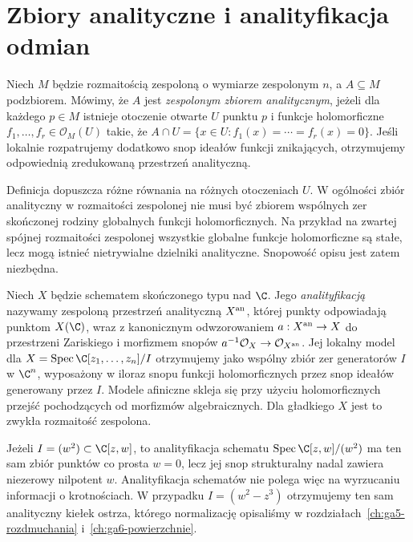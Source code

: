 \section{Zbiory analityczne i analityfikacja odmian}
\label{sec:ga9-analityczne}

\begin{definicja}
Niech $M$ będzie rozmaitością zespoloną o wymiarze zespolonym $n$,
a $A\subseteq M$ podzbiorem. Mówimy, że $A$ jest
\emph{zespolonym zbiorem analitycznym}, jeżeli dla każdego $p\in M$
istnieje otoczenie otwarte $U$ punktu $p$ i funkcje holomorficzne
$f_1,\ldots,f_r\in\mathcal O_M(U)$ takie, że
$A\cap U=\{x\in U:f_1(x)=\cdots=f_r(x)=0\}$.
Jeśli lokalnie rozpatrujemy dodatkowo snop ideałów funkcji znikających,
otrzymujemy odpowiednią zredukowaną przestrzeń analityczną.
\end{definicja}

\begin{uwaga}
Definicja dopuszcza różne równania na różnych otoczeniach $U$.
W ogólności zbiór analityczny w rozmaitości zespolonej nie musi być
zbiorem wspólnych zer skończonej rodziny globalnych funkcji
holomorficznych. Na przykład na zwartej spójnej rozmaitości zespolonej
wszystkie globalne funkcje holomorficzne są stałe, lecz mogą istnieć
nietrywialne dzielniki analityczne. Snopowość opisu jest zatem
niezbędna.
\end{uwaga}

\begin{definicja}[Analityfikacja]
Niech $X$ będzie schematem skończonego typu nad $\C$. Jego
\emph{analityfikacją} nazywamy zespoloną przestrzeń analityczną
$X^{\rm an}$, której punkty odpowiadają punktom $X(\C)$,
wraz z kanonicznym odwzorowaniem $a:X^{\rm an}\to X$
do przestrzeni Zariskiego i morfizmem snopów
$a^{-1}\mathcal O_X\to\mathcal O_{X^{\rm an}}$.
Jej lokalny model dla
$X=\operatorname{Spec}\C[z_1,\ldots,z_n]/I$ otrzymujemy jako wspólny
zbiór zer generatorów $I$ w $\C^n$, wyposażony w iloraz snopu
funkcji holomorficznych przez snop ideałów generowany przez $I$.
Modele afiniczne skleja się przy użyciu holomorficznych przejść
pochodzących od morfizmów algebraicznych. Dla gładkiego $X$ jest to
zwykła rozmaitość zespolona.
\end{definicja}

\begin{uwaga}
Jeżeli $I=(w^2)\subset\C[z,w]$, to analityfikacja schematu
$\operatorname{Spec}\C[z,w]/(w^2)$ ma ten sam zbiór punktów co prosta
$w=0$, lecz jej snop strukturalny nadal zawiera niezerowy nilpotent
$w$. Analityfikacja schematów nie polega więc na wyrzucaniu informacji
o krotnościach. W przypadku $I=(w^2-z^3)$ otrzymujemy ten sam
analityczny kiełek ostrza, którego normalizację opisaliśmy w
rozdziałach~\ref{ch:ga5-rozdmuchania} i~\ref{ch:ga6-powierzchnie}.
\end{uwaga}

